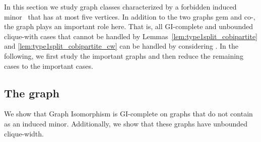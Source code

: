\documentclass[envcountsame,envcountsect,11pt,a4paper]{llncs}
\begin{document}
In this section we study graph classes characterized by a forbidden induced minor~ that has at most five vertices. 
In addition to the two graphs gem and co-,
the graph  plays an important role here.
That is, all GI-complete and unbounded clique-with cases that cannot be handled by 
Lemmas~\ref{lem:type1split_cobipartite} and \ref{lem:type1split_cobipartite_cw}
can be handled by considering .
In the following, we first study the important graphs and then
reduce the remaining cases to the important cases.


\subsection{The graph }
We show that {\sc Graph Isomorphism} is GI-complete on graphs that do not contain  as an induced minor. Additionally, we show that these graphs have unbounded clique-width.
\end{document}
